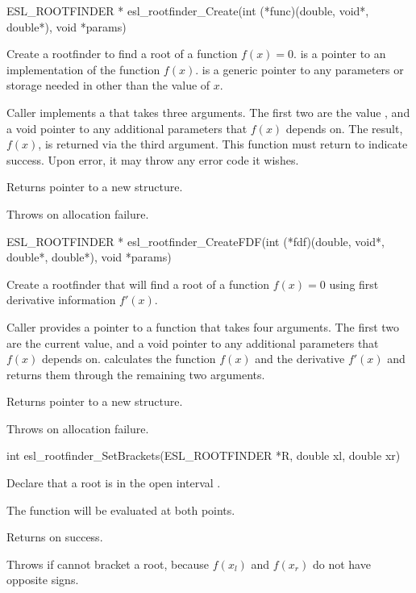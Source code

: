 \begin{sreapi}
\hypertarget{func:esl_rootfinder_Create()}
{\item[ESL\_ROOTFINDER * esl\_rootfinder\_Create(int (*func)(double, void*, double*), void *params)]}

Create a rootfinder to find a root of a function $f(x) = 0$.
 is a pointer to an implementation of the
function $f(x)$.  is a generic pointer to any
parameters or storage needed in  other than
the value of $x$. 

Caller implements a  that takes three arguments.
The first two are the value , and a void pointer to
any additional parameters that $f(x)$ depends on. The
result, $f(x)$, is returned via the third argument. This
function must return  to indicate success. Upon
error, it may throw any error code it wishes.


Returns pointer to a new  structure.

Throws  on allocation failure.


\hypertarget{func:esl_rootfinder_CreateFDF()}
{\item[ESL\_ROOTFINDER * esl\_rootfinder\_CreateFDF(int (*fdf)(double, void*, double*, double*), void *params)]}

Create a rootfinder that will find 
a root of a function $f(x) = 0$ using first derivative
information $f'(x)$. 

Caller provides a pointer  to a function that
takes four arguments. The first two are the current 
value, and a void pointer to any additional parameters
that $f(x)$ depends on.  calculates the function
$f(x)$ and the derivative $f'(x)$ and returns them
through the remaining two arguments.

Returns pointer to a new  structure.

Throws  on allocation failure.


\hypertarget{func:esl_rootfinder_SetBrackets()}
{\item[int esl\_rootfinder\_SetBrackets(ESL\_ROOTFINDER *R, double xl, double xr)]}

Declare that a root is in the open interval 
. 

The function will be evaluated at both points.

Returns  on success.

Throws  if  cannot bracket a root,
because $f(x_l)$ and $f(x_r)$ do not have opposite
signs.


\end{sreapi}
